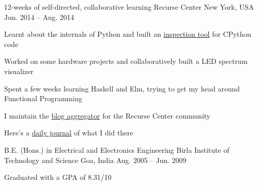 

\begin{cventries}

  \cventry
      {12-weeks of self-directed, collaborative learning}
      {Recurse Center }
      {New York, USA} %
      {Jun. 2014 -- Aug. 2014} %
      {
        \begin{cvitems} %
        \item {Learnt about the internals of Python and built an \href{https://github.com/punchagan/cinspect}{inspection tool} for CPython code}
        \item {Worked on some hardware projects and collaboratively built a LED spectrum visualizer}
        \item {Spent a few weeks learning Haskell and Elm, trying to get my head around Functional Programming}
        \item {I maintain the \href{https://github.com/recursecenter/blaggregator/commits?author=punchagan}{blog aggregator} for the Recurse Center community}
        \item {Here’s a \href{https://punchagan.muse-amuse.in/recurse-center/}{daily journal} of what I did there}
        \end{cvitems}
      }
  \cventry
      {B.E. (Hons.) in Electrical and Electronics Engineering} %
      {Birla Institute of Technology and Science } %
      {Goa, India} %
      {Aug. 2005 -- Jun. 2009} %
      {
        \begin{cvitems} %
        \item {Graduated with a GPA of 8.31/10}
        \end{cvitems}
      }
\end{cventries}

